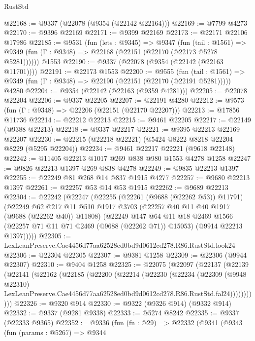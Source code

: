 \begin{lexlean}{RustStd}
\begin{coremodule}
@22168 := @9337 (@22078 (@9354 (@22142 @22164)))
@22169 := @7799 @4273
@22170 := @9396 @22169
@22171 := @9399 @22169
@22173 := @22171 @22106 @17986
@22185 := @9531
    (fun (lets : @9345) =>
    @9347
      (fun (tail : @1561) =>
      @9349 (fun (Γ : @9348) => @22168 (@22151 (@22170 (@22173 @5278 @5281))))))
    @1553
@22190 := @9337 (@22078 (@9354 (@22142 (@22163 @11701))))
@22191 := @22173 @1553
@22200 := @9555
    (fun (tail : @1561) => @9349 (fun (Γ : @9348) => @22190 (@22151 (@22170 (@22191 @5281)))))
    @4280
@22204 := @9354 (@22142 (@22163 (@9359 @4281)))
@22205 := @22078 @22204
@22206 := @9337 @22205
@22207 := @22191 @4280
@22212 := @9573 (fun (Γ : @9348) => @22206 (@22151 (@22170 @22207)))
@22213 := @17856 @11736
@22214 := @22212 @22213
@22215 := @9461 @22205
@22217 := @22149 (@9388 @22213)
@22218 := @9337 @22217
@22221 := @9395 @22213 @22169 @22207
@22230 := @22215 (@22218 @22221) (@5424 @8222 @8218 @22204 @8229 (@5295 @22204))
@22234 := @9461 @22217 @22221 (@9618 @22148)
@22242 := @11405 @22213 @1017 @269 @838 @980 @1553 @4278 @1258
@22247 := @9826 @22213 @1397 @269 @838 @4278
@22249 := @9835 @22213 @1397
@22255 := @22249 @81 @268 @14 @837 @1915 @4277
@22257 := @9680 @22213 @1397
@22261 := @22257 @53 @14 @53 @1915
@22262 := @9689 @22213
@22304 := @22242
    (@22247
      (@22255
        (@22261 (@9688 (@22262 @53)) @11791)
        (@22249
          @62
          @217
          @11
          @510
          @1917
          @3703
          (@22257 @40 @11 @40 @1917 (@9688 (@22262 @40)) @11808)
          (@22249
            @147
            @64
            @11
            @18
            @2469
            @1566
            (@22257 @71 @11 @71 @2469 (@9688 (@22262 @71)) @15053)
            (@9914 @22213 @1397)))))
@22305 := LexLeanPreserve.Cae4456d77aa62528ed0bd9d0612cd278.R86.RustStd.look24
@22306 := @22304 @22305
@22307 := @9381 @1258
@22309 := @22306 (@9944 @22307)
@22310 := @9404 @1258
@22325 := @22075
    (@22097
      (@22137
        (@22139
          (@22141
            (@22162
              (@22185
                (@22200
                  (@22214
                    (@22230
                      (@22234
                        (@22309
                          (@9948 @22310)
                          LexLeanPreserve.Cae4456d77aa62528ed0bd9d0612cd278.R86.RustStd.fal24)))))))))))
@22326 := @9320 @914
@22330 := @9322 (@9326 @914) (@9332 @914)
@22332 := @9337 (@9281 @9338)
@22333 := @5274 @8242
@22335 := @9337 (@22333 @9365)
@22352 := @9336
    (fun (fn : @29) =>
    @22332
      (@9341
        (@9343
          (fun (params : @5267) =>
          @9344

\end{coremodule}
\end{lexlean}
